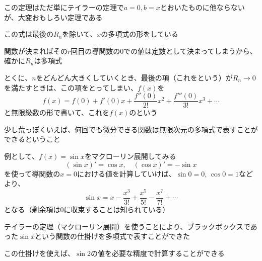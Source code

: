 \documentclass[../book_infinite_continuous_math]{subfiles}
\begin{document}
この定理はただ単にテイラーの定理で$a=0, b=x$とおいたものに他ならないが、大変おもしろい定理である

\br

この式は最後の$R_n$を除いて、$x$の多項式の形をしている

関数が決まればその$r$回目の導関数の$0$での値は定数として決まってしまうから、確かに$R_n$は多項式

\br

とくに、$n$をどんどん大きくしていくとき、最後の項（これをという）が$R_n \to 0$を満たすときは、この項をとってしまい、$f(x)$を
\begin{equation*}
  f(x) = f(0) + f'(0)x + \dfrac{f''(0)}{2!}x^2 + \dfrac{f'''(0)}{3!}x^3 + \cdots
\end{equation*}
と無限級数の形で書いて、これを$f(x)$のという

少し荒っぽくいえば、何回でも微分できる関数は無限次元の多項式で表すことができるということ

\br

例として、$f(x) = \sin x$をマクローリン展開してみる
\begin{equation*}
  (\sin x)' = \cos x, \quad (\cos x)' = -\sin x
\end{equation*}
を使って導関数の$x=0$における値を計算していけば、$\sin 0 = 0, \, \cos 0 = 1$などより、
\begin{equation*}
  \sin x = x - \dfrac{x^3}{3!} + \dfrac{x^5}{5!} - \dfrac{x^7}{7!} + \cdots
\end{equation*}
となる（剰余項は$0$に収束することは知られている）

\br

テイラーの定理（マクローリン展開）を使うことにより、ブラックボックスであった$\sin x$という関数の仕掛けを多項式で表すことができた

この仕掛けを使えば、$\sin 2$の値を必要な精度で計算することができる
\end{document}
